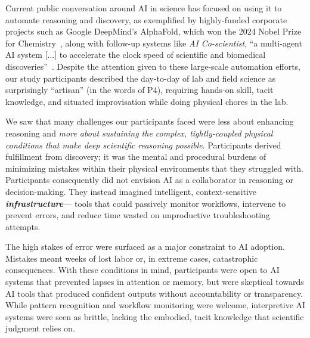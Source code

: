 
Current public conversation around AI in science has focused on using it to automate reasoning and discovery, as exemplified by highly-funded corporate projects such as Google DeepMind's AlphaFold, which won the 2024 Nobel Prize for Chemistry~\cite{jumper2021highly}, along with follow-up systems like \emph{AI Co-scientist}, ``a multi-agent AI system [...] to accelerate the clock speed of scientific and biomedical discoveries''~\cite{gottweis2025towards}. Despite the attention given to these large-scale automation efforts, our study participants described the day-to-day of lab and field science as surprisingly ``artisan'' (in the words of P4), requiring hands-on skill, tacit knowledge, and situated improvisation while doing physical chores in the lab.

We saw that many challenges our participants faced were less about enhancing reasoning and \emph{more about sustaining the complex, tightly-coupled physical conditions that make deep scientific reasoning possible}. Participants derived fulfillment from discovery; it was the mental and procedural burdens of minimizing mistakes within their physical environments that they struggled with. Participants consequently did not envision AI as a collaborator in reasoning or decision-making. They instead imagined intelligent, context-sensitive \textbf{\textit{infrastructure}}--- tools that could passively monitor workflows, intervene to prevent errors, and reduce time wasted on unproductive troubleshooting attempts. 

The high stakes of error were surfaced as a major constraint to AI adoption. Mistakes meant weeks of lost labor or, in extreme cases, catastrophic consequences. With these conditions in mind, participants were open to AI systems that prevented lapses in attention or memory, but were skeptical towards AI tools that produced confident outputs without accountability or transparency. While pattern recognition and workflow monitoring were welcome, interpretive AI systems were seen as brittle, lacking the embodied, tacit knowledge that scientific judgment relies on.

